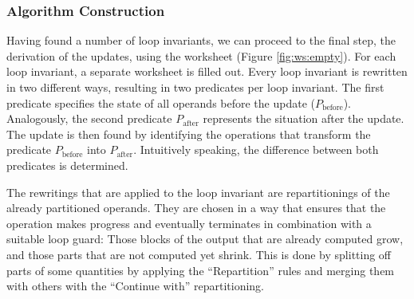 \subsubsection{Algorithm Construction}

Having found a number of loop invariants, we can proceed to the final step, the derivation of the updates, using the worksheet (Figure \ref{fig:ws:empty}). For each loop invariant, a separate worksheet is filled out. Every loop invariant is rewritten in two different ways, resulting in two predicates per loop invariant. The first predicate specifies the state of all operands before the update ($P_\text{before}$). Analogously, the second predicate $P_\text{after}$ represents the situation after the update. The update is then found by identifying the operations that transform the predicate $P_\text{before}$ into $P_\text{after}$. Intuitively speaking, the difference between both predicates is determined.

The rewritings that are applied to the loop invariant are repartitionings of the already partitioned operands. They are chosen in a way that ensures that the operation makes progress and eventually terminates in combination with a suitable loop guard: Those blocks of the output that are already computed grow, and those parts that are not computed yet shrink. This is done by splitting off parts of some quantities by applying the ``Repartition'' rules and merging them with others with the ``Continue with'' repartitioning.
%

